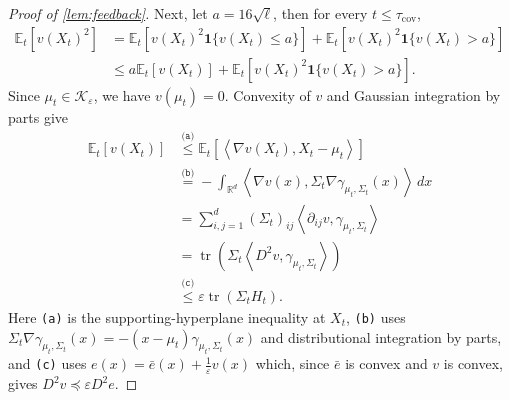 \documentclass[11pt]{article}
\newcommand{\R}{\mathbb R}
\newcommand{\E}{\mathbb E}
\newcommand{\K}{\mathcal K}
\newcommand{\tr}{\operatorname{tr}}
\newcommand{\1}{\mathbf 1}
\newcommand{\eps}{\varepsilon}
\newcommand{\ip}[2]{\left\langle #1,#2\right\rangle}
\begin{document}
\begin{proof}[Proof of \cref{lem:feedback}]
    Next, let $a=16\sqrt{\ell}$,
    then for every $t\leq\tau_{\mathrm{cov}}$,
    \begin{align}
        \E_t[v(X_t)^2]
         & =
        \E_t\left[
            v(X_t)^2\1\{v(X_t)\leq a\}
            \right]
        +
        \E_t\left[
            v(X_t)^2\1\{v(X_t)>a\}
            \right]
        \nonumber \\
         & \leq
        a\E_t[v(X_t)]
        +
        \E_t\left[
            v(X_t)^2\1\{v(X_t)>a\}
            \right].
        \label{eq:feedback-v2-split}
    \end{align}
    Since $\mu_t\in\K_\eps$, we have $v(\mu_t)=0$.  Convexity of $v$ and
    Gaussian integration by parts give
    \begin{align}
        \E_t[v(X_t)]
         & \stackrel{\texttt{(a)}}{\leq}
        \E_t\left[
            \ip{\nabla v(X_t)}{X_t-\mu_t}
            \right]
        \nonumber                        \\
         & \stackrel{\texttt{(b)}}{=}
        -\int_{\R^d}
        \ip{\nabla v(x)}
        {\Sigma_t\nabla\gamma_{\mu_t,\Sigma_t}(x)}
        \,dx
        \nonumber                        \\
         & =
        \sum_{i,j=1}^d
        (\Sigma_t)_{ij}
        \left\langle
        \partial_{ij}v,
        \gamma_{\mu_t,\Sigma_t}
        \right\rangle
        \nonumber                        \\
         & =
        \tr\left(
        \Sigma_t
        \left\langle
        D^2v,\gamma_{\mu_t,\Sigma_t}
        \right\rangle
        \right)
        \nonumber                        \\
         & \stackrel{\texttt{(c)}}{\leq}
        \eps\tr(\Sigma_tH_t).
        \label{eq:feedback-v-first-moment}
    \end{align}
    Here \texttt{(a)} is the supporting-hyperplane inequality at $X_t$,
    \texttt{(b)} uses
    $\Sigma_t\nabla\gamma_{\mu_t,\Sigma_t}(x)
        =-(x-\mu_t)\gamma_{\mu_t,\Sigma_t}(x)$
    and distributional integration by parts, and \texttt{(c)} uses
    $e(x) = \bar{e}(x) + \frac{1}{\eps} v(x)$ which, since $\bar{e}$ is
    convex and $v$ is convex, gives $D^2v \preceq \eps D^2e.$


\end{proof}
\end{document}
